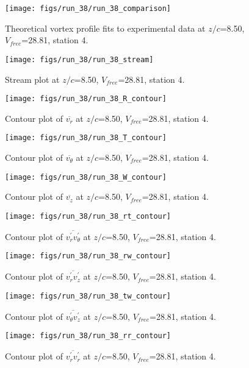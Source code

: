 \begin{figure}[H]
\centering
\texttt{[image: figs/run\_38/run\_38\_comparison]}
\caption{Theoretical vortex profile fits to experimental data at $z/c$=8.50, $V_{free}$=28.81, station 4.}
\end{figure}


\begin{figure}[H]
\centering
\texttt{[image: figs/run\_38/run\_38\_stream]}
\caption{Stream plot at $z/c$=8.50, $V_{free}$=28.81, station 4.}
\end{figure}


\begin{figure}[H]
\centering
\texttt{[image: figs/run\_38/run\_38\_R\_contour]}
\caption{Contour plot of $\overline{v_{r}}$ at $z/c$=8.50, $V_{free}$=28.81, station 4.}
\end{figure}


\begin{figure}[H]
\centering
\texttt{[image: figs/run\_38/run\_38\_T\_contour]}
\caption{Contour plot of $\overline{v_{\theta}}$ at $z/c$=8.50, $V_{free}$=28.81, station 4.}
\end{figure}


\begin{figure}[H]
\centering
\texttt{[image: figs/run\_38/run\_38\_W\_contour]}
\caption{Contour plot of $\overline{v_{z}}$ at $z/c$=8.50, $V_{free}$=28.81, station 4.}
\end{figure}


\begin{figure}[H]
\centering
\texttt{[image: figs/run\_38/run\_38\_rt\_contour]}
\caption{Contour plot of $\overline{v_{r}^{\prime} v_{\theta}^{\prime}}$ at $z/c$=8.50, $V_{free}$=28.81, station 4.}
\end{figure}


\begin{figure}[H]
\centering
\texttt{[image: figs/run\_38/run\_38\_rw\_contour]}
\caption{Contour plot of $\overline{v_{r}^{\prime} v_{z}^{\prime}}$ at $z/c$=8.50, $V_{free}$=28.81, station 4.}
\end{figure}


\begin{figure}[H]
\centering
\texttt{[image: figs/run\_38/run\_38\_tw\_contour]}
\caption{Contour plot of $\overline{v_{\theta}^{\prime} v_{z}^{\prime}}$ at $z/c$=8.50, $V_{free}$=28.81, station 4.}
\end{figure}


\begin{figure}[H]
\centering
\texttt{[image: figs/run\_38/run\_38\_rr\_contour]}
\caption{Contour plot of $\overline{v_{r}^{\prime} v_{r}^{\prime}}$ at $z/c$=8.50, $V_{free}$=28.81, station 4.}
\end{figure}



